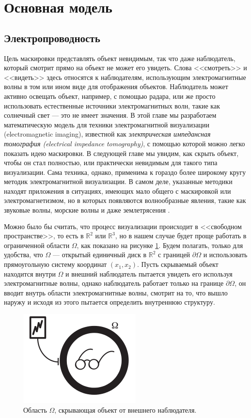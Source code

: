 \documentclass[a4paper, 12pt]{article}
\begin{document}
\section{Основная модель}
\subsection{Электропроводность}


Цель маскировки представлять объект невидимым, так что даже наблюдатель, который 
смотрит прямо на объект не
может его увидеть. Слова <<смотреть>> и <<видеть>> здесь относятся к наблюдателям, 
использующим
электромагнитные волны в том или ином виде для отображения объектов. Наблюдатель может 
активно освещать
объект, например, с помощью радара, или же просто использовать естественные источники 
электромагнитных волн,
такие как солнечный свет --- это не имеет значения. В этой главе мы разработаем 
математическую модель для
техники электромагнитной визуализации (electromagnetic imaging), известной как 
\textit{электрическая
импедансная томография (electrical impedance tomography)}, с помощью которой можно 
легко показать идею
маскировки. В следующей главе мы увидим, как скрыть объект, чтобы он стал полностью, 
или практически
невидимым для такого типа визуализации. Сама техника, однако, применима к гораздо 
более широкому кругу
методик электромагнитной визуализации. В самом деле, указанные методики находят 
приложения в ситуациях,
имеющих мало общего с маскировкой или электромагнетизмом, но в которых появляются 
волнообразные явления,
такие как звуковые волны, морские волны и даже землетрясения \cite{2}.


Можно было бы считать, что процесс визуализации происходит в <<свободном 
пространстве>>, то есть в
$\mathbb{R}^2$ или $\mathbb{R}^3$, но в нашем случае будет проще работать в 
ограниченной области $\Omega$,
как показано на рисунке \ref{fig:1}. Будем полагать, только для удобства, что $\Omega$ 
--- открытый
единичный диск в $\mathbb{R}^2$ с границей $\partial \Omega$ и использовать 
прямоугольную систему координат
$(x_1, x_2)$. Пусть скрываемый объект находится внутри $\Omega$ и внешний наблюдатель 
пытается увидеть его
используя электромагнитные волны, однако наблюдатель работает только на границе 
$\partial \Omega$, он вводит
внутрь области электромагнитные волны, смотрит на то, что вышло наружу и исходя из 
этого пытается определить
внутреннюю структуру.
\begin{figure}[t]
  \centering
  \includegraphics[height=0.15\paperheight]{1.png}
  \caption{Область $\Omega$, скрывающая объект от внешнего наблюдателя.}
  \label{fig:1}
\end{figure}
\end{document}
